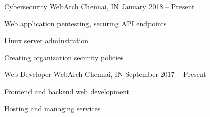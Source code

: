 \documentclass[]{awesome-cv}
\begin{document}
\vspace{-7mm}
\begin{cventries}
	\cventry
	{Cybersecurity}
	{WebArch}
	{Chennai, IN}
	{January 2018 – Present}
	{\begin{cvitems}
		\item {Web application pentesting, securing API endpoints}
		\item {Linux server adminstration}
		\item {Creating organization security policies}
		\end{cvitems}}
	\cventry
	{Web Developer}
	{WebArch}
	{Chennai, IN}
	{September 2017 – Present}
	{\begin{cvitems}
		\item {Frontend and backend web development}
		\item {Hosting and managing services}
		\end{cvitems}}
\end{cventries}
\end{document}
